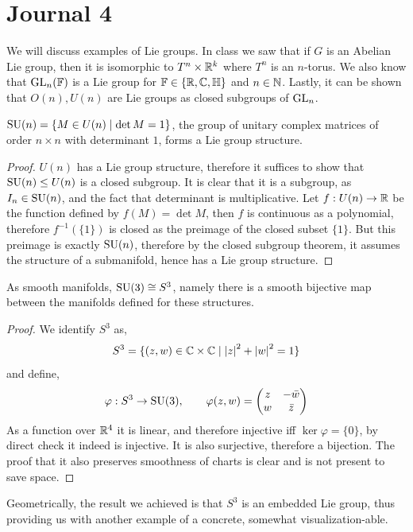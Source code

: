 \section{Journal 4}
We will discuss examples of Lie groups.
In class we saw that if $G$ is an Abelian Lie group, then it is isomorphic to $T^n \times \mathbb{R}^k$ where $T^n$ is an $n$-torus.
We also know that $\operatorname{GL}_n(\mathbb{F})$ is a Lie group for $\mathbb{F} \in \{\mathbb{R}, \mathbb{C}, \mathbb{H}\}$ and $n \in \mathbb{N}$.
Lastly, it can be shown that $O(n), U(n)$ are Lie groups as closed subgroups of $\operatorname{GL}_n$.
\begin{proposition}
	$\operatorname{SU}(n) = \{ M \in U(n) \mid \det M = 1 \}$, the group of unitary complex matrices of order $n \times n$ with determinant $1$, forms a Lie group structure.
\end{proposition}
\begin{proof}
	$U(n)$ has a Lie group structure, therefore it suffices to show that $\operatorname{SU}(n) \le U(n)$ is a closed subgroup.
	It is clear that it is a subgroup, as $I_n \in \operatorname{SU}(n)$, and the fact that determinant is multiplicative.
	Let $f : U(n) \to \mathbb{R}$ be the function defined by $f(M) = \det M$, then $f$ is continuous as a polynomial, therefore $f^{-1}(\{ 1 \})$ is closed as the preimage of the closed subset $\{ 1 \}$.
	But this preimage is exactly $\operatorname{SU}(n)$, therefore by the closed subgroup theorem, it assumes the structure of a submanifold, hence has a Lie group structure.
\end{proof}
\begin{proposition}
	As smooth manifolds, $\operatorname{SU}(3) \cong S^3$, namely there is a smooth bijective map between the manifolds defined for these structures.
\end{proposition}
\begin{proof}
	We identify $S^3$ as,
	\[
		S^3
		= \{ (z, w) \in \mathbb{C} \times \mathbb{C} \mid {|z|}^2 + {|w|}^2 = 1 \}
	\]
	and define,
	\[
		\varphi : S^3 \to \operatorname{SU}(3),
		\qquad
		\varphi(z, w)
		= \begin{pmatrix}
			z & -\bar{w} \\
			w & \bar{z}
		\end{pmatrix}
	\]
	As a function over $\mathbb{R}^4$ it is linear, and therefore injective iff $\ker \varphi = \{ 0 \}$, by direct check it indeed is injective.
	It is also surjective, therefore a bijection.
	The proof that it also preserves smoothness of charts is clear and is not present to save space.
\end{proof}
Geometrically, the result we achieved is that $S^3$ is an embedded Lie group, thus providing us with another example of a concrete, somewhat visualization-able.


